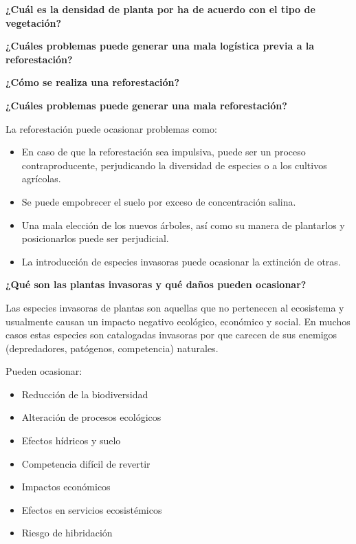 \documentclass{article}
\newenvironment{question}[1]
{\par\vspace{10pt}\noindent\textbf{#1}\par\noindent\vspace{3pt}}
{\par\vspace{5pt}}
\begin{document}
\begin{question}{¿Cuál es la densidad de planta por ha de acuerdo con el tipo de vegetación?}
\end{question}

\begin{question}{¿Cuáles problemas puede generar una mala logística previa a la reforestación?}
\end{question}

\begin{question}{¿Cómo se realiza una reforestación?}
\end{question}

\begin{question}{¿Cuáles problemas puede generar una mala reforestación?}
	La reforestación puede ocasionar problemas como:

	\begin{itemize}
		\item En caso de que la reforestación sea impulsiva, puede ser un proceso contraproducente, perjudicando la diversidad de especies o a los cultivos agrícolas.
		\item Se puede empobrecer el suelo por exceso de concentración salina.
		\item Una mala elección de los nuevos árboles, así como su manera de plantarlos y posicionarlos puede ser perjudicial.
		\item La introducción de especies invasoras puede ocasionar la extinción de otras.
	\end{itemize}
\end{question}

\begin{question}{¿Qué son las plantas invasoras y qué daños pueden ocasionar?}

	Las especies invasoras de plantas son aquellas que no pertenecen al ecosistema y usualmente causan un impacto negativo ecológico, económico y social. En muchos casos estas especies son catalogadas invasoras por que carecen de sus enemigos (depredadores, patógenos, competencia) naturales.

	Pueden ocasionar:

	\begin{itemize}
		\item Reducción de la biodiversidad
		\item Alteración de procesos ecológicos
		\item Efectos hídricos y suelo
		\item Competencia difícil de revertir
		\item Impactos económicos
		\item Efectos en servicios ecosistémicos
		\item Riesgo de hibridación
	\end{itemize}
\end{question}
\end{document}
